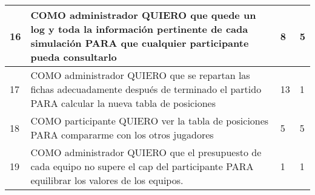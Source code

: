 \begin{center}
\begin{tabular}{| l | p{10cm} | l | l | }
16 & COMO administrador QUIERO que quede un log y toda la información pertinente de cada simulación PARA que cualquier participante pueda consultarlo & 8 & 5\\  \hline
17 & COMO administrador QUIERO que se repartan las fichas adecuadamente después de terminado el partido PARA calcular la nueva tabla de posiciones & 13 & 1\\  \hline
18 & COMO participante QUIERO ver la tabla de posiciones PARA compararme con los otros jugadores & 5 & 5\\  \hline
19 & COMO administrador QUIERO que el presupuesto de cada equipo no supere el cap del participante PARA equilibrar los valores de los equipos. & 1 & 1\\  \hline
  \end{tabular}
\end{center}
